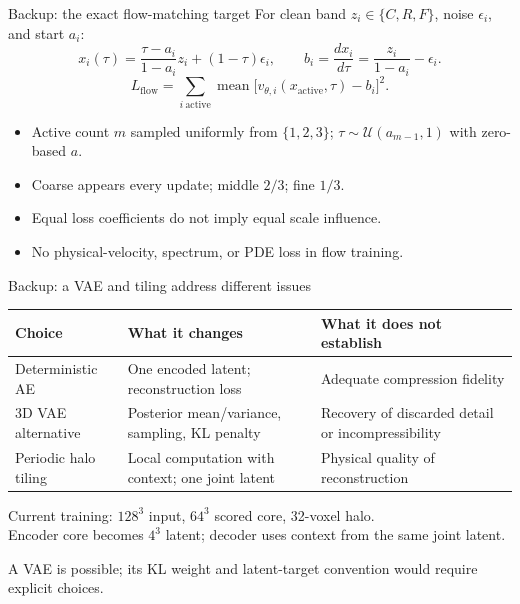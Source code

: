 \documentclass[aspectratio=169,11pt]{beamer}
\newcommand{\keypoint}[1]{\begin{block}{}#1\end{block}}
\begin{document}
\appendix
{}

\begin{frame}{Backup: the exact flow-matching target}
  \small
  For clean band $z_i\in\{C,R,F\}$, noise $\epsilon_i$, and start $a_i$:
  \[
    x_i(\tau)=\frac{\tau-a_i}{1-a_i}z_i+(1-\tau)\epsilon_i,
    \qquad
    b_i=\frac{d x_i}{d\tau}=\frac{z_i}{1-a_i}-\epsilon_i.
  \]
  \[
    L_{\mathrm{flow}}=\sum_{i\ \mathrm{active}}
       \operatorname{mean}\bigl[v_{\theta,i}(x_{\mathrm{active}},\tau)-b_i\bigr]^2.
  \]
  \begin{itemize}
    \item Active count $m$ sampled uniformly from $\{1,2,3\}$;
          $\tau\sim\mathcal U(a_{m-1},1)$ with zero-based $a$.
    \item Coarse appears every update; middle $2/3$; fine $1/3$.
    \item Equal loss coefficients do not imply equal scale influence.
    \item No physical-velocity, spectrum, or PDE loss in flow training.
  \end{itemize}
\end{frame}

\begin{frame}{Backup: a VAE and tiling address different issues}
  \small
  \begin{tabularx}{\linewidth}{lYY}
    \toprule
    Choice & What it changes & What it does not establish \\
    \midrule
    Deterministic AE & One encoded latent; reconstruction loss & Adequate compression fidelity \\
    3D VAE alternative & Posterior mean/variance, sampling, KL penalty & Recovery of discarded detail or incompressibility \\
    Periodic halo tiling & Local computation with context; one joint latent & Physical quality of reconstruction \\
    \bottomrule
  \end{tabularx}
  \medskip
  Current training: $128^3$ input, $64^3$ scored core, 32-voxel halo.\\
  Encoder core becomes $4^3$ latent; decoder uses context from the same joint latent.
  \keypoint{A VAE is possible; its KL weight and latent-target convention would require explicit choices.}
\end{frame}
\end{document}
